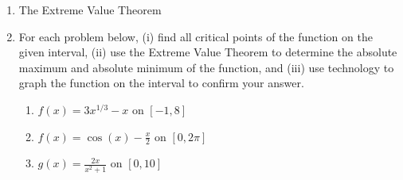 \documentclass[11pt,fleqn]{article}
\begin{document}
\setlength{\parindent}{0cm}
\renewcommand{\headrulewidth}{0pt}
\newcommand{\blank}[1]{\rule{#1}{0.75pt}}
\renewcommand{\d}{\displaystyle}
\vspace*{-0.7in}
\begin{center}
 {\large{ }}
\end{center}
 \begin{enumerate}
 \item The Extreme Value Theorem
 \vspace{2in}
 \item For each problem below, (i) find all critical points of the function on the given interval, (ii) use the Extreme Value Theorem to determine the absolute maximum and absolute minimum of the function, and (iii) use technology to graph the function on the interval to confirm your answer.
 \begin{enumerate}
 \item $f(x)=3x^{1/3}-x$ on $[-1,8]$
 \newpage
 \item $f(x)=\cos(x) - \frac{x}{2}$ on $[0,2\pi]$
 \vfill
 \item $g(x)=\frac{2x}{x^2+1}$ on $[0,10]$
 \vfill
 \end{enumerate}
 \end{enumerate}
\end{document}
